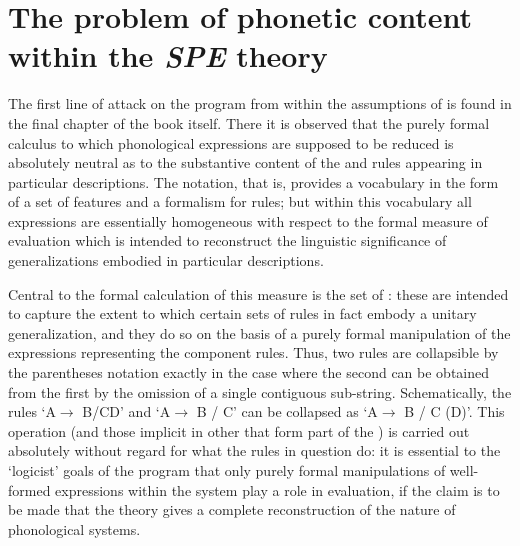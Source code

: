 \section{The problem of phonetic content within the \textsl{{SPE}} theory}

The first line of attack on the \textsl{} program from within the
assumptions of  is found in the final chapter of the
book itself. There it is observed that the purely formal calculus to
which phonological expressions are supposed to be reduced is
absolutely neutral as to the substantive content of the
 and rules appearing in particular descriptions. The
notation, that is, provides a vocabulary in the form of a set of
features and a formalism for rules; but within this vocabulary all
expressions are essentially homogeneous with respect to the formal
measure of evaluation which is intended to reconstruct the linguistic
significance of generalizations embodied in particular descriptions.

Central to the formal calculation of this measure is the set of
: these are intended to capture the extent to
which certain sets of rules in fact embody a unitary generalization,
and they do so on the basis of a purely formal manipulation of the
expressions representing the component rules. Thus, two rules are
collapsible by the parentheses notation exactly in the case where the
second can be obtained from the first by the omission of a single
contiguous sub-string. Schematically, the rules `A$\rightarrow$
B/CD\gapline' and `A$\rightarrow$ B / C\gapline' can be collapsed as
`A$\rightarrow$ B / C (D)\gapline'.  This operation (and those
implicit in other  that form part of the
) is carried out absolutely without regard for what
the rules in question do: it is essential to the `logicist' goals of
the \textsl{} program that only purely formal manipulations of
well-formed expressions within the system play a role in evaluation,
if the claim is to be made that the theory gives a complete
reconstruction of the nature of phonological systems.

